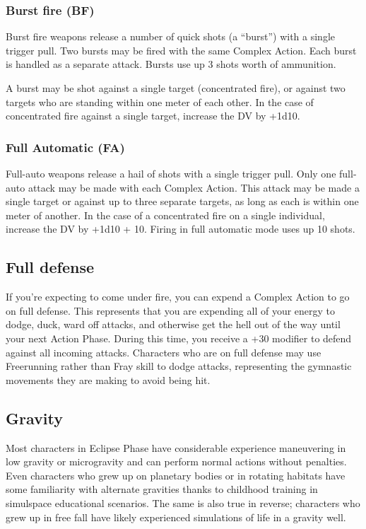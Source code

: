 \subsubsection{Burst fire (BF)} 

Burst fire weapons release a number of quick shots (a ``burst”) with a single trigger pull. Two bursts may be fired with the same Complex Action. Each burst is handled as a separate attack. Bursts use up 3 shots worth of ammunition. 

A burst may be shot against a single target (concentrated fire), or against two targets who are standing within one meter of each other. In the case of concentrated fire against a single target, increase the DV by +1d10. 

\subsubsection{Full Automatic (FA)} 

Full-auto weapons release a hail of shots with a single trigger pull. Only one full-auto attack may be made with each Complex Action. This attack may be made a single target or against up to three separate targets, as long as each is within one meter of another. In the case of a concentrated fire on a single individual, increase the DV by +1d10 + 10. Firing in full automatic mode uses up 10 shots. 



\subsection{Full defense} \label{sec:full-defense} 

If you’re expecting to come under fire, you can expend a Complex Action to go on full defense. This represents that you are expending all of your energy to dodge, duck, ward off attacks, and otherwise get the hell out of the way until your next Action Phase. During this time, you receive a +30 modifier to defend against all incoming attacks. Characters who are on full defense may use Freerunning rather than Fray skill to dodge attacks, representing the gymnastic movements they are making to avoid being hit. 

\subsection{Gravity} \label{sec:gravity} 

Most characters in Eclipse Phase have considerable experience maneuvering in low gravity or microgravity and can perform normal actions without penalties. Even characters who grew up on planetary bodies or in rotating habitats have some familiarity with alternate gravities thanks to childhood training in simulspace educational scenarios. The same is also true in reverse; characters who grew up in free fall have likely experienced simulations of life in a gravity well. 

